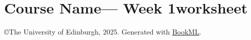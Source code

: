 \documentclass[12pt,oneside]{book}
\newcommand\coursename{Course Name}
\newcommand\weeknumber{1}
\newcommand\coursedescription{Week \weeknumber worksheet}
\begin{document}
\setcounter{section}{\weeknumber}
\section{\coursename --- \coursedescription}





\iflatexml
    \copyright The University of Edinburgh, 2025. Generated with \href{https://vlmantova.github.io/bookml/}{BookML}.
\fi
\end{document}
